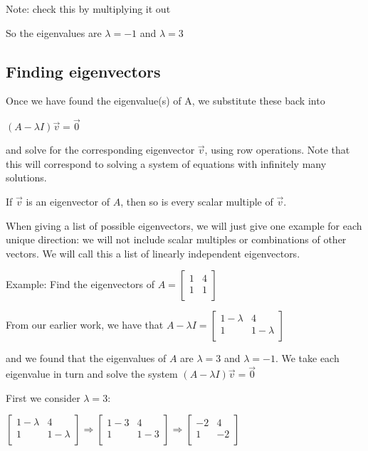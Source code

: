 \documentclass{extarticle}
\begin{document}
\begin{multicols}{2}
Note: check this by multiplying it out

So the eigenvalues are $\lambda=-1$ and $\lambda=3$


\subsection{Finding eigenvectors}
Once we have found the eigenvalue(s) of A, we substitute these back into

$\left(A-\lambda I\right)\vec{v}=\vec{0}$

and solve for the corresponding eigenvector $\vec{v}$, using row operations.
Note that this will correspond to solving a system of equations with infinitely many solutions.


If $\vec{v}$ is an eigenvector of $A$, then so is every scalar multiple of $\vec{v}$.

When giving a list of possible eigenvectors, we will just give one example for each unique direction: we will not include scalar multiples or combinations of other vectors. We will call this a list of linearly independent eigenvectors.


Example: Find the eigenvectors of $A=\left[\begin{matrix}1&4\\1&1\\\end{matrix}\right]$

From our earlier work, we have that $A-\lambda I=\left[\begin{matrix}1-\lambda&4\\1&1-\lambda\\\end{matrix}\right]$

and we found that the eigenvalues of $A$ are $\lambda=3$ and $\lambda=-1$. We take each eigenvalue in turn and solve the system $\left(A-\lambda I\right)\vec{v}=\vec{0}$

First we consider $\lambda=3$:

$\left[\begin{matrix}1-\lambda&4\\1&1-\lambda\\\end{matrix}\right]\Rightarrow\left[\begin{matrix}1-3&4\\1&1-3\\\end{matrix}\right]\Rightarrow\left[\begin{matrix}-2&4\\1&-2\\\end{matrix}\right]$


\end{multicols}
\end{document}
